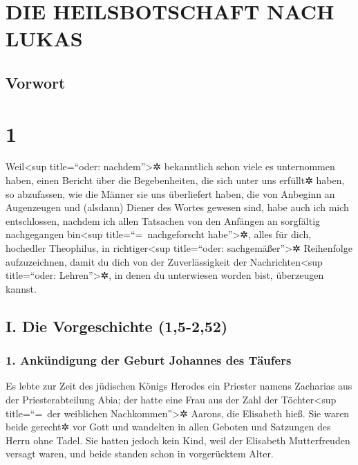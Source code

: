 \hypertarget{die-heilsbotschaft-nach-lukas}{%
\section{DIE HEILSBOTSCHAFT NACH
LUKAS}\label{die-heilsbotschaft-nach-lukas}}

\hypertarget{vorwort}{%
\subsection{Vorwort}\label{vorwort}}

\hypertarget{section}{%
\section{1}\label{section}}

 Weil\textless sup title=``oder: nachdem''\textgreater✲
bekanntlich schon viele es unternommen haben, einen Bericht über die
Begebenheiten, die sich unter uns erfüllt✲ haben, so abzufassen,
 wie die Männer sie uns überliefert haben, die von
Anbeginn an Augenzeugen und (alsdann) Diener des Wortes gewesen sind,
 habe auch ich mich entschlossen, nachdem ich allen
Tatsachen von den Anfängen an sorgfältig nachgegangen bin\textless sup
title=``=~nachgeforscht habe''\textgreater✲, alles für dich, hochedler
Theophilus, in richtiger\textless sup title=``oder:
sachgemäßer''\textgreater✲ Reihenfolge aufzuzeichnen, 
damit du dich von der Zuverlässigkeit der Nachrichten\textless sup
title=``oder: Lehren''\textgreater✲, in denen du unterwiesen worden
bist, überzeugen kannst.

\hypertarget{i.-die-vorgeschichte-15-252}{%
\subsection{I. Die Vorgeschichte
(1,5-2,52)}\label{i.-die-vorgeschichte-15-252}}

\hypertarget{ankuxfcndigung-der-geburt-johannes-des-tuxe4ufers}{%
\subsubsection{1. Ankündigung der Geburt Johannes des
Täufers}\label{ankuxfcndigung-der-geburt-johannes-des-tuxe4ufers}}

 Es lebte zur Zeit des jüdischen Königs Herodes ein
Priester namens Zacharias aus der Priesterabteilung Abia; der hatte eine
Frau aus der Zahl der Töchter\textless sup title=``=~der weiblichen
Nachkommen''\textgreater✲ Aarons, die Elisabeth hieß.  Sie
waren beide gerecht✲ vor Gott und wandelten in allen Geboten und
Satzungen des Herrn ohne Tadel.  Sie hatten jedoch kein
Kind, weil der Elisabeth Mutterfreuden versagt waren, und beide standen
schon in vorgerücktem Alter.

